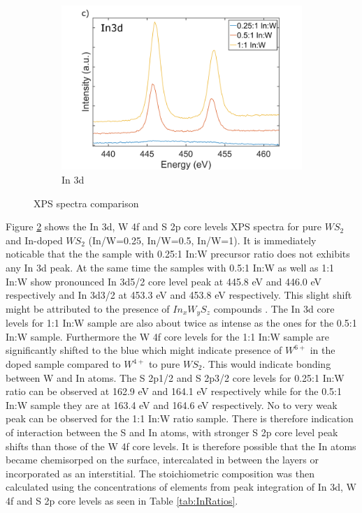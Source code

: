 \begin{figure}[!h]
\begin{center}
\begin{subfigure}[b]{0.6\textwidth}
			\includegraphics[width=\textwidth]{In/XPSIn3d.png}
			\caption{In 3d}
			\label{fig:InXPSIn3d}
		\end{subfigure}
		\caption{XPS spectra comparison}
		\label{fig:InXPSSpectra}
	\end{center}
\end{figure}

Figure \ref{fig:InXPSSpectra} shows the In 3d, W 4f and S 2p core levels XPS spectra for pure $WS_2$ and In-doped $WS_2$ (In/W=0.25, In/W=0.5, In/W=1). It is immediately noticable that the the sample with 0.25:1 In:W precursor ratio does not exhibits any In 3d peak. At the same time the samples with 0.5:1 In:W as well as 1:1 In:W show pronounced In 3d5/2 core level peak at 445.8 eV and 446.0 eV respectively and In 3d3/2 at 453.3 eV and 453.8 eV respectively. This slight shift might be attributed to the presence of $In_xW_yS_z$ compounds \cite{Wagner1991}. The In 3d core levels for 1:1 In:W sample are also about twice as intense as the ones for the 0.5:1 In:W sample. Furthermore the W 4f core levels for the 1:1 In:W sample are significantly shifted to the blue which might indicate presence of $W^{6+}$ in the doped sample compared to $W^{4+}$ to pure $WS_2$. This would indicate bonding between W and In atoms. The S 2p1/2 and S 2p3/2 core levels for 0.25:1 In:W ratio can be observed at 162.9 eV and 164.1 eV respectively while for the 0.5:1 In:W sample they are at 163.4 eV and 164.6 eV respectively. No to very weak peak can be observed for the 1:1 In:W ratio sample. There is therefore indication of interaction between the S and In atoms, with stronger S 2p core level peak shifts than those of the W 4f core levels. It is therefore possible that the In atoms became chemisorped on the surface, intercalated in between the layers or incorporated as an interstitial. The stoichiometric composition was then calculated using the concentrations of elements from peak integration of In 3d, W 4f and S 2p core levels as seen in Table \ref{tab:InRatios}.

